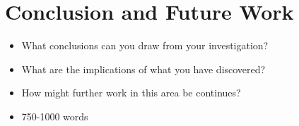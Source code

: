 \section{Conclusion and Future Work}

\begin{itemize}
    \item What conclusions can you draw from your investigation?
    \item What are the implications of what you have discovered?
    \item How might further work in this area be continues?
    \item 750-1000 words
\end{itemize}